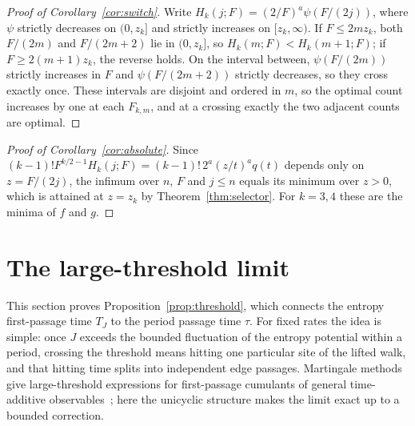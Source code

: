 \documentclass[11pt]{article}
\theoremstyle{remark}
\begin{document}
\begin{proof}[Proof of Corollary~\ref{cor:switch}]
Write $H_k(j;F)=(2/F)^a\psi(F/(2j))$, where $\psi$ strictly decreases on
$(0,z_k]$ and strictly increases on $[z_k,\infty)$. If $F\le2mz_k$, both
$F/(2m)$ and $F/(2m+2)$ lie in $(0,z_k]$, so $H_k(m;F)<H_k(m+1;F)$; if
$F\ge2(m+1)z_k$, the reverse holds. On the interval between, $\psi(F/(2m))$
strictly increases in $F$ and $\psi(F/(2m+2))$ strictly decreases, so they
cross exactly once. These intervals are disjoint and ordered in $m$, so
the optimal count increases by one at each $F_{k,m}$, and at a crossing
exactly the two adjacent counts are optimal.
\end{proof}

\begin{proof}[Proof of Corollary~\ref{cor:absolute}]
Since $(k-1)!F^{k/2-1}H_k(j;F)=(k-1)!\,2^a(z/t)^aq(t)$ depends only on
$z=F/(2j)$, the infimum over $n$, $F$ and $j\le n$ equals its minimum over
$z>0$, which is attained at $z=z_k$ by Theorem~\ref{thm:selector}. For
$k=3,4$ these are the minima of $f$ and $g$.
\end{proof}

\section{The large-threshold limit}\label{sec:threshold}

This section proves Proposition~\ref{prop:threshold}, which connects the
entropy first-passage time $T_J$ to the period passage time $\tau$. For
fixed rates the idea is simple: once $J$ exceeds the bounded fluctuation of
the entropy potential within a period, crossing the threshold means hitting
one particular site of the lifted walk, and that hitting time splits into
independent edge passages. Martingale methods give large-threshold expressions for
first-passage cumulants of general time-additive observables~\cite{neri};
here the unicyclic structure makes the limit exact up to a bounded
correction.
\end{document}
